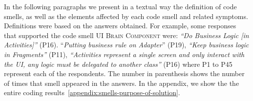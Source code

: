 In the following paragraphs we present in a textual way the definition of code smells, as well as the elements affected by each code smell and related symptoms. 
Definitions were based on the answers obtained. For example, some responses that supported the code smell \textsc{\small UI Brain Component} were: \textit{``Do Business Logic [in Activities]''} (P16). ``\textit{Putting business rule on Adapter}'' (P19), \textit{``Keep business logic in Fragments''} (P11), \textit{``Activities represent a single screen and only interact with the UI, any logic must be delegated to another class''} (P16) where P1 to P45 represent each of the respondents. 
The number in parenthesis shows the number of times that smell appeared in the answers.
In the appendix, we show the the entire coding results~\ref{appendix:smells-purpose-of-solution}.

